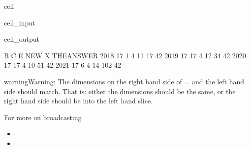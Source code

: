\documentclass[letterpaper,10pt,english]{jupyterBook}
\begin{document}
\begin{sphinxuseclass}{cell}\begin{sphinxVerbatimInput}

\begin{sphinxuseclass}{cell_input}
\begin{sphinxVerbatim}[commandchars=\\\{\}]
\PYG{p}{[}\PYG{p}{]}  
\end{sphinxVerbatim}

\end{sphinxuseclass}\end{sphinxVerbatimInput}
\begin{sphinxVerbatimOutput}

\begin{sphinxuseclass}{cell_output}
\begin{sphinxVerbatim}[commandchars=\\\{\}]
       B   C  E  NEW    X  THE\PYGZus{}ANSWER
2018  17   1  4   11   17          42
2019  17  17  4   12   34          42
2020  17  17  4   10   51          42
2021  17   6  4   14  102          42
\end{sphinxVerbatim}

\end{sphinxuseclass}\end{sphinxVerbatimOutput}

\end{sphinxuseclass}
\begin{sphinxadmonition}{warning}{Warning:}
\sphinxAtStartPar
The dimensions on the right hand side of = and the left hand side should match. That is: either the dimensions should be the same, or the right hand side should be  into the left hand slice.

\sphinxAtStartPar
For more on broadcasting 
\end{sphinxadmonition}

\sphinxAtStartPar
{}
\begin{itemize}
\item {} 
\sphinxAtStartPar
{}

\item {} 
\sphinxAtStartPar
{}

\end{itemize}
\end{document}
